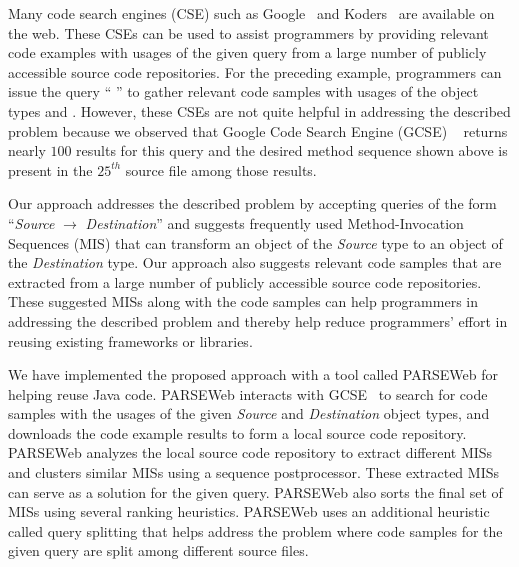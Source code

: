 Many code search engines (CSE) such as Google~\cite{GCSE} and
Koders~\cite{KODERS} are
available on the web. These CSEs can be used to assist programmers
by providing relevant code examples with usages of the given query
from a large number of publicly accessible source code repositories.
For the preceding example, programmers can issue the query
`` '' to gather
relevant code samples with usages of the object types
 and . However, these
CSEs are not quite helpful in addressing the described problem
because we observed that Google Code Search Engine (GCSE)
~\cite{GCSE} returns nearly $100$ results for this
query and the desired method sequence shown above is present in the
$25^{th}$ source file among those results.

Our approach addresses the described problem by accepting
queries of the form ``\emph{Source} $\rightarrow$
\emph{Destination}'' and suggests frequently used Method-Invocation
Sequences (MIS) that can transform an object of the \emph{Source}
type to an object of the \emph{Destination} type. Our approach also
suggests relevant code samples that are extracted from a large
number of publicly accessible source code repositories. These
suggested MISs along with the code samples can help programmers in
addressing the described problem and thereby help reduce
programmers' effort in reusing existing frameworks or libraries.

We have implemented the proposed approach with a tool called
PARSEWeb for helping reuse Java code. PARSEWeb interacts with
GCSE~\cite{GCSE} to search for code samples with the usages of the
given \emph{Source} and \emph{Destination} object types, and
downloads the code example results to form a local source code
repository. PARSEWeb analyzes the local source code repository to
extract different MISs and clusters similar MISs using a
sequence postprocessor. These extracted MISs can serve as a solution for
the given query. PARSEWeb also sorts the final set of MISs using
several ranking heuristics. PARSEWeb uses an additional heuristic
called query splitting that helps address the problem where
code samples for the given query are split among different source
files.

